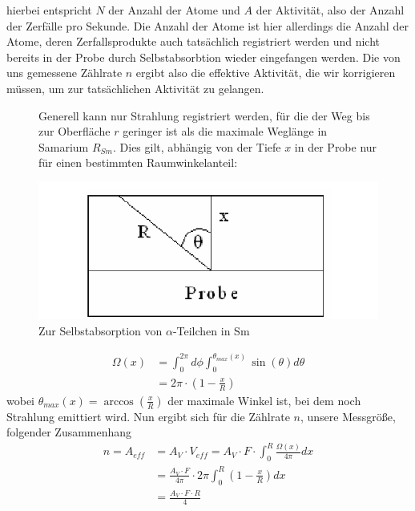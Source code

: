 hierbei entspricht $N$ der Anzahl der Atome und $A$ der Aktivität, also der Anzahl der Zerfälle pro Sekunde. Die Anzahl der Atome ist hier allerdings die Anzahl der Atome, deren Zerfallsprodukte auch tatsächlich registriert werden und nicht bereits in der Probe durch Selbstabsorbtion wieder eingefangen werden. Die von uns gemessene Zählrate $n$ ergibt also die effektive Aktivität, die wir korrigieren müssen, um zur tatsächlichen Aktivität zu gelangen.

\begin{figure}[h]
\begin{minipage}{0.49\textwidth}
Generell kann nur Strahlung registriert werden, für die der Weg bis zur Oberfläche $r$ geringer ist als die maximale Weglänge in Samarium $R_{Sm}$. Dies gilt, abhängig von der Tiefe $x$ in der Probe nur für einen bestimmten Raumwinkelanteil:
\end{minipage}
\begin{minipage}{0.49\textwidth}
 \centering \includegraphics[width=0.9\linewidth]{Bilder/korrektur_alpha.png}
 \caption{Zur Selbstabsorption von $\alpha$-Teilchen in Sm}
\end{minipage}
\end{figure}

\begin{align}
 \Omega \left( x \right) &= \int_0^{2\pi}d\phi \int_0^{\theta_{max}(x)} \sin \left( \theta \right) d \theta \\
 & = 2 \pi \cdot \left( 1 - \frac{x}{R} \right)
\end{align}
wobei $\theta_{max}\left( x \right) = \arccos \left( \frac{x}{R} \right)$ der maximale Winkel ist, bei dem noch Strahlung emittiert wird. Nun ergibt sich für die Zählrate $n$, unsere Messgröße, folgender Zusammenhang
\begin{align}
 n = A_{eff} &= A_V \cdot V_{eff} = A_V \cdot F \cdot \int_0^R \frac{\Omega \left( x \right)}{4\pi} dx \\
   & = \frac{A_V \cdot F}{4 \pi} \cdot 2 \pi \int_0^R \left( 1 - \frac{x}{R} \right) dx \\
   & = \frac{A_V \cdot F \cdot R}{4}
\end{align}

